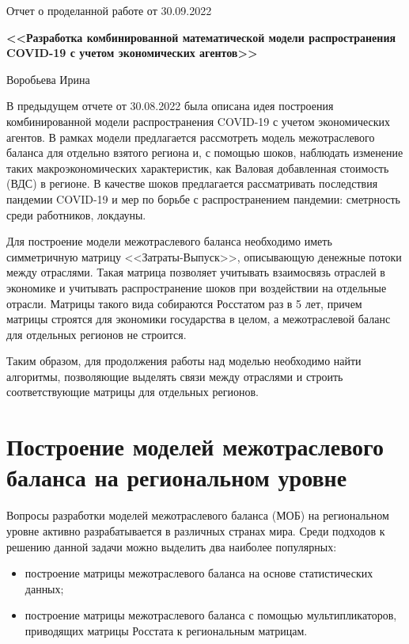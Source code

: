 \documentclass[12pt, a4paper]{article}
\begin{document}
\begin{center}
Отчет о проделанной работе от 30.09.2022

\textbf{<<Разработка комбинированной математической модели распространения COVID-19 с учетом экономических агентов>>}

Воробьева Ирина
\end{center}


В предыдущем отчете от 30.08.2022 была описана идея построения комбинированной модели распространения COVID-19 с учетом экономических агентов. В рамках модели предлагается рассмотреть модель межотраслевого баланса для отдельно взятого региона и, с помощью шоков, наблюдать изменение таких макроэкономических характеристик, как Валовая добавленная стоимость (ВДС) в регионе. В качестве шоков предлагается рассматривать последствия пандемии COVID-19 и мер по борьбе с распространением пандемии: сметрность среди работников, локдауны.

Для построение модели межотраслевого баланса необходимо иметь симметричную матрицу <<Затраты-Выпуск>>, описывающую денежные потоки между отраслями. Такая матрица позволяет учитывать взаимосвязь отраслей в экономике и учитывать распространение шоков при воздействии на отдельные отрасли. Матрицы такого вида собираются Росстатом раз в 5 лет, причем матрицы строятся для экономики государства в целом, а межотраслевой баланс для отдельных регионов не строится.

Таким образом, для продолжения работы над моделью необходимо найти алгоритмы, позволяющие выделять связи между отраслями и строить соответствующие матрицы для отдельных регионов.

\section{Построение моделей межотраслевого баланса на региональном уровне}

Вопросы разработки моделей межотраслевого баланса (МОБ) на региональном уровне активно разрабатывается в различных странах мира. Среди подходов к решению данной задачи можно выделить два наиболее популярных:
\begin{itemize}
\item построение матрицы межотраслевого баланса на основе статистических данных;
\item построение матрицы межотраслевого баланса с помощью мультипликаторов, приводящих матрицы Росстата к региональным матрицам.
\end{itemize}
\end{document}
